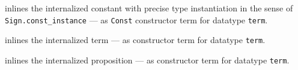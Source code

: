 \begin{isabellebody}
\begin{isamarkuptext}
\begin{description}
  \item {} inlines the internalized
  constant  with precise type instantiation in the sense of
  \verb|Sign.const_instance| --- as \verb|Const| constructor term for
  datatype \verb|term|.

  \item {} inlines the internalized term 
  --- as constructor term for datatype \verb|term|.

  \item {} inlines the internalized proposition
   --- as constructor term for datatype \verb|term|.


\end{description}
\end{isamarkuptext}
\end{isabellebody}
